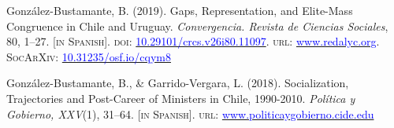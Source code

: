\begin{publications}
\begin{benumerate}{8}
\item{\small Gonz\'alez-Bustamante, B. (2019). Gaps, Representation, and Elite-Mass Congruence in Chile and Uruguay. {\itshape Convergencia. Revista de Ciencias Sociales}, 80, 1--27. {\footnotesize \scshape [in Spanish]}. {\scshape doi}: \href{https://doi.org/10.29101/crcs.v26i80.11097}{\textcolor{blue}{10.29101/crcs.v26i80.11097}}. {\scshape url}:  \href{https://www.redalyc.org/jatsRepo/105/10559568002/index.html}{\textcolor{blue}{www.redalyc.org}}. {\scshape \footnotesize SocArXiv}: \href{https://doi.org/10.31235/osf.io/cqym8}{\textcolor{blue}{10.31235/osf.io/cqym8}}}\vspace{1mm}

\item{\small Gonz\'alez-Bustamante, B., \& Garrido-Vergara, L. (2018). Socialization, Trajectories and Post-Career of Ministers in Chile, 1990-2010. {\itshape Pol\'itica y Gobierno, XXV}(1), 31--64. {\footnotesize \scshape [in Spanish]}. {\scshape url}: \href{http://www.politicaygobierno.cide.edu/index.php/pyg/article/view/1080}{\textcolor{blue}{www.politicaygobierno.cide.edu}}}\vspace{1mm}

\end{benumerate}

\end{publications}


